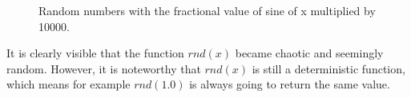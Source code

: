 \begin{figure}[H]
    \centering
    \caption{Random numbers with the fractional value of sine of x multiplied by 10000.}
\end{figure}

\noindent
It is clearly visible that the function $rnd(x)$ became chaotic and seemingly random. However, it is noteworthy that $rnd(x)$ is still a deterministic function, which means for example $rnd(1.0)$ is always going to return the same value.